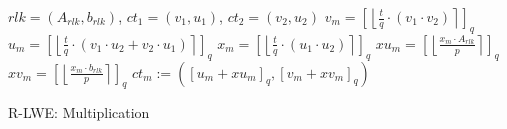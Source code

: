 \begin{algorithm}[htb]
  \begin{algorithmic}[1]
    \REQUIRE $rlk=(A_{rlk}, b_{rlk})$, $ct_1 = (v_1, u_1)$, $ct_2 = (v_2, u_2)$
    \STATE $v_m = \left[\left\lfloor \frac{t}{q}\cdot (v_1 \cdot v_2)\right\rceil\right] _q $
    \STATE $u_m = \left[\left\lfloor \frac{t}{q}\cdot(v_1 \cdot u_2 + v_2 \cdot u_1)\right\rceil\right] _q$
    \STATE $x_m = \left[\left\lfloor \frac{t}{q}\cdot(u_1 \cdot u_2)\right\rceil\right] _q$
    \STATE $xu_m = \left[\left\lfloor \frac{x_m \cdot A_{rlk}}{p}  \right\rceil \right]_q$
    \STATE $xv_m = \left[\left\lfloor \frac{x_m \cdot b_{rlk}}{p}  \right\rceil \right]_q$
    \RETURN $ct_m:=(\left[u_m + xu_m\right]_q , \left[v_m + xv_m\right]_q )$
  \end{algorithmic}
  \caption{R-LWE: Multiplication}
  \label{alg:RingMultiplication}
\end{algorithm}

